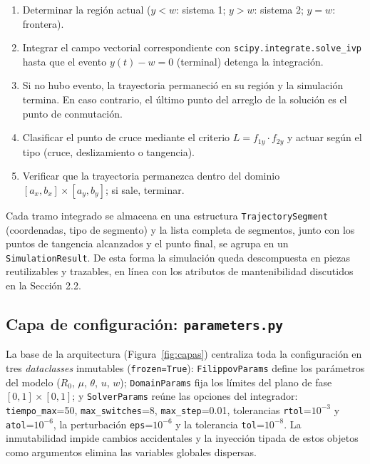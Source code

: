 \documentclass[12pt,letterpaper]{article}
\begin{document}
\begin{enumerate}
    \item Determinar la región actual ($y < w$: sistema 1; $y > w$: sistema 2; $y = w$: frontera).
    \item Integrar el campo vectorial correspondiente con \texttt{scipy.integrate.solve\_ivp} hasta que el evento $y(t) - w = 0$ (terminal) detenga la integración.
    \item Si no hubo evento, la trayectoria permaneció en su región y la simulación termina. En caso contrario, el último punto del arreglo de la solución es el punto de conmutación.
    \item Clasificar el punto de cruce mediante el criterio $L = f_{1y} \cdot f_{2y}$ y actuar según el tipo (cruce, deslizamiento o tangencia).
    \item Verificar que la trayectoria permanezca dentro del dominio $[a_x,b_x]\times[a_y,b_y]$; si sale, terminar.
\end{enumerate}

Cada tramo integrado se almacena en una estructura \texttt{TrajectorySegment} (coordenadas, tipo de segmento) y la lista completa de segmentos, junto con los puntos de tangencia alcanzados y el punto final, se agrupa en un \texttt{SimulationResult}. De esta forma la simulación queda descompuesta en piezas reutilizables y trazables, en línea con los atributos de mantenibilidad discutidos en la Sección 2.2.

\subsection{Capa de configuración: \texttt{parameters.py}}
La base de la arquitectura (Figura~\ref{fig:capas}) centraliza toda la configuración en tres \emph{dataclasses} inmutables (\texttt{frozen=True}): \texttt{FilippovParams} define los parámetros del modelo ($R_0$, $\mu$, $\theta$, $u$, $w$); \texttt{DomainParams} fija los límites del plano de fase $[0,1]\times[0,1]$; y \texttt{SolverParams} reúne las opciones del integrador: \texttt{tiempo\_max}=50, \texttt{max\_switches}=8, \texttt{max\_step}=0.01, tolerancias \texttt{rtol}=$10^{-3}$ y \texttt{atol}=$10^{-6}$, la perturbación \texttt{eps}=$10^{-6}$ y la tolerancia \texttt{tol}=$10^{-8}$. La inmutabilidad impide cambios accidentales y la inyección tipada de estos objetos como argumentos elimina las variables globales dispersas.
\end{document}
